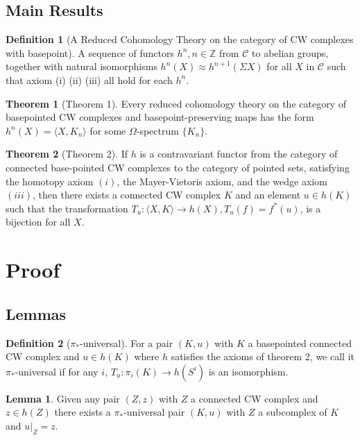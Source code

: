 \documentclass[11pt, oneside]{article}   	%
\theoremstyle{definition}
\newtheorem*{defn}{Definition}
\newtheorem*{thm}{Theorem}
\newtheorem{lem}{Lemma}
\begin{document}
\subsection{Main Results}

\begin{defn}[A Reduced Cohomology Theory on the category of CW complexes with basepoint]
	A sequence of functors $h^n, n\in \mathbb{Z}$ from $\mathcal{C}$ to abelian groups, together with natural isomorphisms $h^n(X)\approx h^{n+1}(\Sigma X)$ for all $X$ in $\mathcal{C}$ such that axiom (i) (ii) (iii) all hold for each $h^n$.
\end{defn}

\begin{thm}[Theorem 1]
	Every reduced cohomology theory on the category of basepointed CW complexes and basepoint-preserving maps has the form $h^n(X) = \langle X, K_n\rangle$ for some $\Omega$-spectrum $\{K_n\}$.
\end{thm}

\begin{thm}[Theorem 2]
	If $h$ is a contravariant functor from the category of connected base-pointed CW complexes to the category of pointed sets, satisfying the homotopy axiom $(i)$, the Mayer-Vietoris axiom, and the wedge axiom $(iii)$, then there exists a connected CW complex $K$ and an element $u\in h(K)$ such that the transformation $T_u: \langle X, K \rangle \to h(X), T_u(f)=f^*(u)$, is a bijection for all $X$.
\end{thm}

\section{Proof}

\subsection{Lemmas}

\begin{defn}[$\pi_*$-universal]
	For a pair $(K, u)$ with $K$ a basepointed connected CW complex and $u\in h(K)$ where $h$ satisfies the axioms of theorem 2, we call it $\pi_*$-universal if for any $i$, $T_u: \pi_i(K)\to h(S^i)$ is an isomorphism.
\end{defn}

\begin{lem}
	Given any pair $(Z, z)$ with $Z$ a connected CW complex and $z\in h(Z)$ there exists a $\pi_*$-universal pair $(K, u)$ with $Z$ a subcomplex of $K$ and $u|_Z = z$.
\end{lem}
\end{document}
